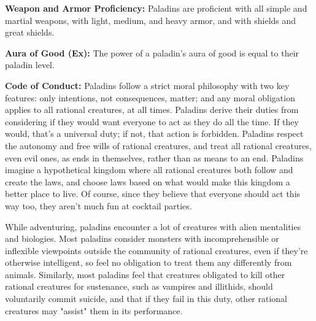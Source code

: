 \textbf{Weapon and Armor Proficiency:} Paladins are proficient with all simple and martial weapons, with light, medium, and heavy armor, and with shields and great shields.

\textbf{Aura of Good (Ex):} The power of a paladin's aura of good is equal to their paladin level.

\textbf{Code of Conduct:} Paladins follow a strict moral philosophy with two key features: only intentions, not consequences, matter; and any moral obligation applies to all rational creatures, at all times. Paladins derive their duties from considering if they would want everyone to act as they do all the time. If they would, that's a universal duty; if not, that action is forbidden. Paladins respect the autonomy and free wills of rational creatures, and treat all rational creatures, even evil ones, as ends in themselves, rather than as means to an end. Paladins imagine a hypothetical kingdom where all rational creatures both follow and create the laws, and choose laws based on what would make this kingdom a better place to live. Of course, since they believe that everyone should act this way too, they aren't much fun at cocktail parties.

While adventuring, paladins encounter a lot of creatures with alien mentalities and biologies. Most paladins consider monsters
with incomprehensible or inflexible viewpoints outside the community of rational creatures, even if they're otherwise intelligent, so feel no obligation to treat them any differently from animals. Similarly, most paladins feel that creatures obligated to kill other rational creatures for sustenance, such as vampires and illithids, should voluntarily commit suicide, and that if they fail in this duty, other rational creatures may "assist" them in its performance.

